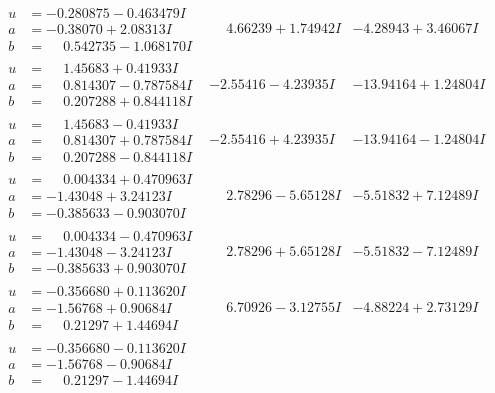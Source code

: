 \documentclass[1p]{elsarticle_modified}
\theoremstyle{definition}
\begin{document}
$$\begin{array}{c|c|c}
\begin{aligned}
u &= -0.280875 - 0.463479 I \\
a &= -0.38070 + 2.08313 I \\
b &= \phantom{-}0.542735 - 1.068170 I\end{aligned}
 & \phantom{-}4.66239 + 1.74942 I & -4.28943 + 3.46067 I \\ \hline\begin{aligned}
u &= \phantom{-}1.45683 + 0.41933 I \\
a &= \phantom{-}0.814307 - 0.787584 I \\
b &= \phantom{-}0.207288 + 0.844118 I\end{aligned}
 & -2.55416 - 4.23935 I & -13.94164 + 1.24804 I \\ \hline\begin{aligned}
u &= \phantom{-}1.45683 - 0.41933 I \\
a &= \phantom{-}0.814307 + 0.787584 I \\
b &= \phantom{-}0.207288 - 0.844118 I\end{aligned}
 & -2.55416 + 4.23935 I & -13.94164 - 1.24804 I \\ \hline\begin{aligned}
u &= \phantom{-}0.004334 + 0.470963 I \\
a &= -1.43048 + 3.24123 I \\
b &= -0.385633 - 0.903070 I\end{aligned}
 & \phantom{-}2.78296 - 5.65128 I & -5.51832 + 7.12489 I \\ \hline\begin{aligned}
u &= \phantom{-}0.004334 - 0.470963 I \\
a &= -1.43048 - 3.24123 I \\
b &= -0.385633 + 0.903070 I\end{aligned}
 & \phantom{-}2.78296 + 5.65128 I & -5.51832 - 7.12489 I \\ \hline\begin{aligned}
u &= -0.356680 + 0.113620 I \\
a &= -1.56768 + 0.90684 I \\
b &= \phantom{-}0.21297 + 1.44694 I\end{aligned}
 & \phantom{-}6.70926 - 3.12755 I & -4.88224 + 2.73129 I \\ \hline\begin{aligned}
u &= -0.356680 - 0.113620 I \\
a &= -1.56768 - 0.90684 I \\
b &= \phantom{-}0.21297 - 1.44694 I\end{aligned}

\end{array}$$
\end{document}
